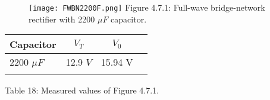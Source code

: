 \begin{figure}[H]
\texttt{[image: FWBN2200F.png]}
\centering \linebreak \linebreak Figure 4.7.1: Full-wave bridge-network rectifier with 2200 $\mu F$ capacitor.
\end{figure}

\begin{multicols}{2}
\begin{center}
\begin{tabular}[.5cm]{l c c c}
\toprule
Capacitor & $V_{T}$ & $V_{0}$ \\
\midrule
2200 $\mu F$ & 12.9 $V$ &  15.94 V \\
\bottomrule
\linebreak
\end{tabular}
\centering \linebreak Table 18: Measured values of Figure 4.7.1.
\end{center} \hfill

\end{multicols}

\pagebreak